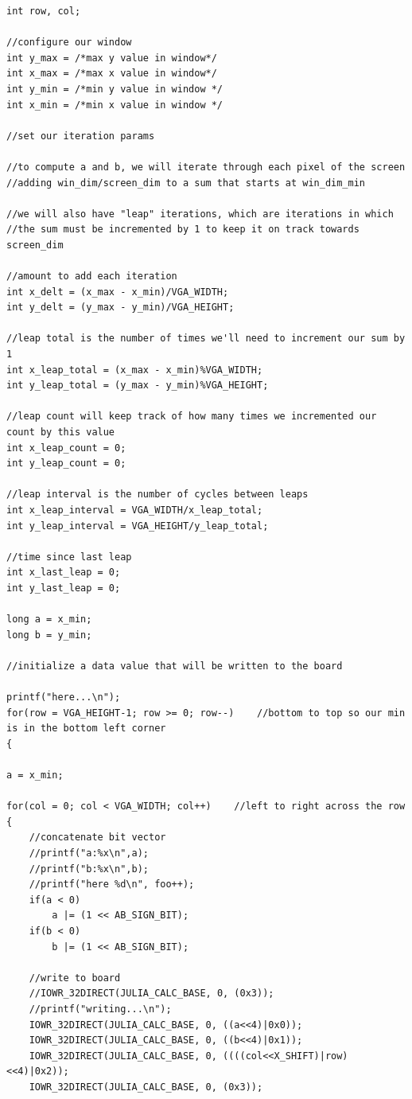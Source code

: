 \documentclass{article}
\begin{document}
\begin{lstlisting}[caption="Window Generation Procedure"]
int row, col;
   
//configure our window
int y_max = /*max y value in window*/
int x_max = /*max x value in window*/
int y_min = /*min y value in window */
int x_min = /*min x value in window */

//set our iteration params

//to compute a and b, we will iterate through each pixel of the screen
//adding win_dim/screen_dim to a sum that starts at win_dim_min

//we will also have "leap" iterations, which are iterations in which
//the sum must be incremented by 1 to keep it on track towards screen_dim

//amount to add each iteration   
int x_delt = (x_max - x_min)/VGA_WIDTH;
int y_delt = (y_max - y_min)/VGA_HEIGHT;

//leap total is the number of times we'll need to increment our sum by 1
int x_leap_total = (x_max - x_min)%VGA_WIDTH;
int y_leap_total = (y_max - y_min)%VGA_HEIGHT;

//leap count will keep track of how many times we incremented our count by this value
int x_leap_count = 0;
int y_leap_count = 0;

//leap interval is the number of cycles between leaps
int x_leap_interval = VGA_WIDTH/x_leap_total;
int y_leap_interval = VGA_HEIGHT/y_leap_total;

//time since last leap
int x_last_leap = 0;
int y_last_leap = 0;

long a = x_min;
long b = y_min;

//initialize a data value that will be written to the board

printf("here...\n");   
for(row = VGA_HEIGHT-1; row >= 0; row--)    //bottom to top so our min is in the bottom left corner
{

a = x_min;

for(col = 0; col < VGA_WIDTH; col++)    //left to right across the row
{
    //concatenate bit vector
    //printf("a:%x\n",a);
    //printf("b:%x\n",b);
    //printf("here %d\n", foo++);
    if(a < 0)
        a |= (1 << AB_SIGN_BIT);
    if(b < 0)
        b |= (1 << AB_SIGN_BIT);
                   
    //write to board
    //IOWR_32DIRECT(JULIA_CALC_BASE, 0, (0x3));
    //printf("writing...\n");
    IOWR_32DIRECT(JULIA_CALC_BASE, 0, ((a<<4)|0x0));
    IOWR_32DIRECT(JULIA_CALC_BASE, 0, ((b<<4)|0x1));
    IOWR_32DIRECT(JULIA_CALC_BASE, 0, ((((col<<X_SHIFT)|row)<<4)|0x2));
    IOWR_32DIRECT(JULIA_CALC_BASE, 0, (0x3));
   

\end{lstlisting}
\end{document}
